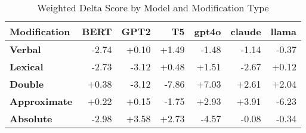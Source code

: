 \begin{table}[h]
\centering
\begin{tabular}{lrrrrrr}
\hline
Modification & \textbf{BERT} & \textbf{GPT2} & \textbf{T5} & \textbf{gpt4o} & \textbf{claude} & \textbf{llama} \\
\hline
\textbf{Verbal} & \cellcolor{red!8} -2.74 & \cellcolor{green!0} +0.10 & \cellcolor{green!4} +1.49 & \cellcolor{red!4} -1.48 & \cellcolor{red!3} -1.14 & \cellcolor{red!1} -0.37 \\
\hline
\textbf{Lexical} & \cellcolor{red!8} -2.73 & \cellcolor{red!9} -3.12 & \cellcolor{green!1} +0.48 & \cellcolor{green!4} +1.51 & \cellcolor{red!7} -2.67 & \cellcolor{green!0} +0.12 \\
\hline
\textbf{Double} & \cellcolor{green!1} +0.38 & \cellcolor{red!9} -3.12 & \cellcolor{red!23} -7.86 & \cellcolor{green!21} +7.03 & \cellcolor{green!7} +2.61 & \cellcolor{green!6} +2.04 \\
\hline
\textbf{Approximate} & \cellcolor{green!0} +0.22 & \cellcolor{green!0} +0.15 & \cellcolor{red!5} -1.75 & \cellcolor{green!8} +2.93 & \cellcolor{green!11} +3.91 & \cellcolor{red!18} -6.23 \\
\textbf{Absolute} & \cellcolor{red!8} -2.98 & \cellcolor{green!10} +3.58 & \cellcolor{green!8} +2.73 & \cellcolor{red!13} -4.57 & \cellcolor{red!0} -0.08 & \cellcolor{red!1} -0.34 \\
\hline
\end{tabular}
\caption{Weighted Delta Score by Model and Modification Type}
\label{tab:ner_results}
\end{table}